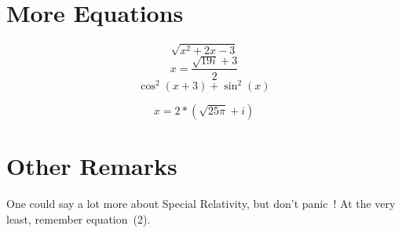\documentclass[10pt,twocolumn]{article}
\begin{document}
\section{More Equations}
\begin{equation}
    \sqrt{x^2 + 2x - 3}
\end{equation}
\begin{equation}
    x = \frac{\sqrt{19i} + 3}{2}
\end{equation}
\begin{equation}
    \cos^2(x + 3) + \sin^2(x)
\end{equation}

\begin{equation}
    x = 2 * (\sqrt{25\pi} + i)
\end{equation}

\section{Other Remarks}

One could say a lot more about Special Relativity, but don't panic~\cite{ref5}! At the very least, remember equation~(2).
\end{document}
